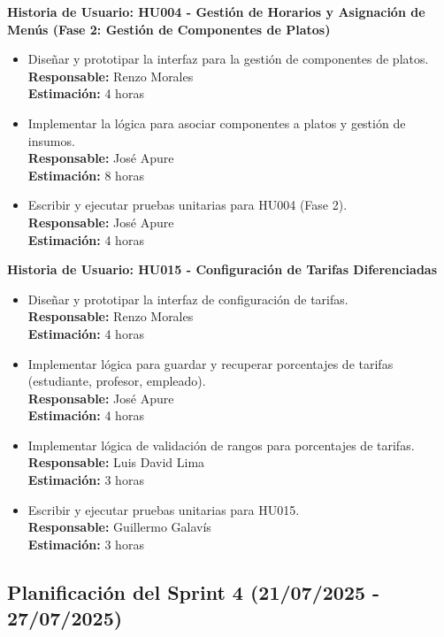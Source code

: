 \documentclass[12pt]{article}
\begin{document}
\textbf{Historia de Usuario: HU004 - Gestión de Horarios y Asignación de Menús (Fase 2: Gestión de Componentes de Platos)}
\begin{itemize}
	\item Diseñar y prototipar la interfaz para la gestión de componentes de platos. \\
	\textbf{Responsable:} Renzo Morales \\
	\textbf{Estimación:} 4 horas
	\item Implementar la lógica para asociar componentes a platos y gestión de insumos. \\
	\textbf{Responsable:} José Apure \\
	\textbf{Estimación:} 8 horas
	\item Escribir y ejecutar pruebas unitarias para HU004 (Fase 2). \\
	\textbf{Responsable:} José Apure \\
	\textbf{Estimación:} 4 horas
\end{itemize}

\pagebreak

\textbf{Historia de Usuario: HU015 - Configuración de Tarifas Diferenciadas}
\begin{itemize}
	\item Diseñar y prototipar la interfaz de configuración de tarifas. \\
	\textbf{Responsable:} Renzo Morales \\
	\textbf{Estimación:} 4 horas
	\item Implementar lógica para guardar y recuperar porcentajes de tarifas (estudiante, profesor, empleado). \\
	\textbf{Responsable:} José Apure \\
	\textbf{Estimación:} 4 horas
	\item Implementar lógica de validación de rangos para porcentajes de tarifas. \\
	\textbf{Responsable:} Luis David Lima \\
	\textbf{Estimación:} 3 horas
	\item Escribir y ejecutar pruebas unitarias para HU015. \\
	\textbf{Responsable:} Guillermo Galavís \\
	\textbf{Estimación:} 3 horas
\end{itemize}

\pagebreak

\subsection{Planificación del Sprint 4 (21/07/2025 - 27/07/2025)}
\end{document}
